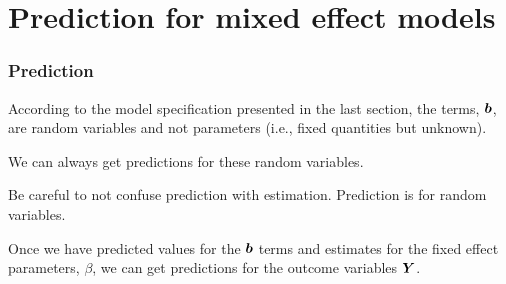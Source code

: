 \documentclass{beamer}
\begin{document}
%


% 
% 
% 
\section{Prediction for mixed effect models}
\begin{frame}
\frametitle{Prediction}
\bi
\item According to the model specification presented in the last section, the terms, $\boldsymbol {b}$, are \alert{random variables} and not parameters (i.e., fixed quantities but unknown). 
\item We can always get \alert{predictions} for these random variables. 
\item Be careful to not confuse \alert{prediction} with \alert{estimation}. Prediction is for random variables. 

\item Once we have predicted values for the $\boldsymbol {b}$ terms and estimates for the fixed effect parameters, $\beta$, we can get predictions for the outcome variables $\boldsymbol {Y}$. 
\ei
\end{frame}
\end{document}
